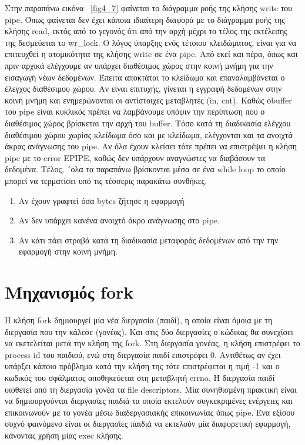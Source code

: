 Στην παραπάνω εικόνα ~\ref{fig4_7} φαίνεται το διάγραμμα ροής της κλήσης write
του pipe. Όπως φαίνεται δεν έχει κάποια ιδιαίτερη διαφορά με το διάγραμμα ροής
της κλήσης read, εκτός από το γεγονός ότι από την αρχή μέχρι το τέλος της
εκτέλεσης της δεσμεύεται το wr\_lock. Ο λόγος ύπαρξης ενός τέτοιου κλειδώματος,
είναι για να επιτευχθεί η ατομικότητα της κλήσης write σε ένα pipe. Από εκεί και
πέρα, όπως και πριν αρχικά ελέγχουμε αν υπάρχει διαθέσιμος χώρος στην κοινή
μνήμη για την εισαγωγή νέων δεδομένων. Έπειτα αποκτάται το κλείδωμα και
επαναλαμβάνεται ο έλεγχος διαθέσιμου χώρου. Αν είναι επιτυχής, γίνεται η εγγραφή
δεδομένων στην κοινή μνήμη και ενημερώνονται οι αντίστοιχες μεταβλητές (in,
cnt). Καθώς οbuffer του pipe είναι κυκλικός πρέπει να λαμβάνουμε υπόψιν την
περίπτωση που ο διαθέσιμος χώρος βρίσκεται την αρχή του buffer. Τόσο κατά τη
διαδικασία ελέγχου διαθέσιμου χώρου χωρίσς κλείδωμα όσο και με κλείδωμα,
ελέγχονται και τα ανοιχτά άκρας ανάγνωσης του pipe. Αν όλα έχουν κλείσει τότε
πρέπει να επιστρέψει η κλήση pipe με το error EPIPE, καθώς δεν υπάρχουν
αναγνώστες να διαβάσουν τα δεδομένα. Τέλος, ´ολα τα παραπάνω βρίσκονται μέσα σε
ένα while loop το οποίο μπορεί να τερματίσει υπό τις τέσσερις παρακάτω συνθήκες.
\begin{enumerate}
	\item Αν έχουν γραφτεί όσα bytes ζήτησε η εφαρμογή
	\item Αν δεν υπάρχει κανένα ανοιχτό άκρο ανάγνωσης στο pipe.
	\item Αν κάτι πάει στραβά κατά τη διαδικασία μεταφοράς δεδομένων από την
		την εφαρμογή στην κοινή μνήμη.
\end{enumerate}

\newpage
\section{Μηχανισμός fork}

Η κλήση fork δημιουργεί μία νέα διεργασία (παιδί), η οποία είναι όμοια με τη
διεργασία που την κάλεσε (γονέας). Και στις δύο διεργασίες ο κώδικας θα
συνεχίσει να εκετελείται μετά την κλήση της fork. Στη διεργασία γονέας, η κλήση
επιστρέφει το process id του παιδιού, ενώ στη διεργασία παιδί επιστρέφει 0.
Αντιθέτως αν έχει υπάρξει κάποιο πρόβλημα κατά την κλήση της τότε επιστρέφεται η
τιμή -1 και ο κωδικός του σφάλματος αποθηκεύεται στη μεταβλητή errno. Η
διεργασία παιδί υιοθετεί από τη διεργασία γονέα τα file descriptors. Μία
συνηθισμένη πρακτική είναι να δημιουργούνται διεργασίες παιδιά τα οποία εκτελούν
συγκεκριμένες ενέργειες και επικοινωνούν με το γονέα μέσω διαδεργασιακής
επικοινωνίας όπως pipe. Ένα εξίσου συχνό φαινόμενο είναι οι διεργασίες παιδιά να
εκτελούν μία διαφορετική εφαρμογή, κάνοντας χρήση μίας exec κλήσης. 

